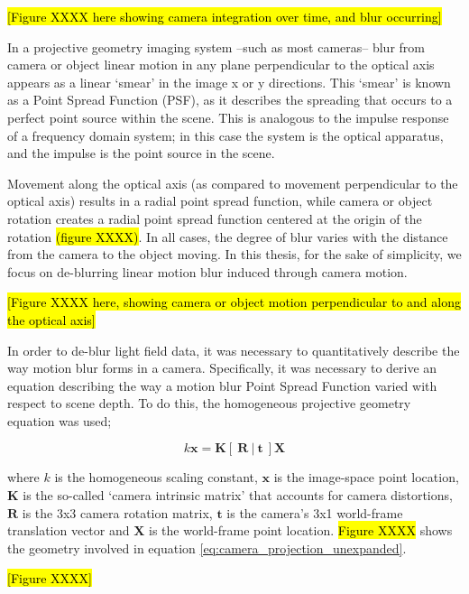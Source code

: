 \hl{[Figure XXXX here showing camera integration over time, and blur occurring]}

In a projective geometry imaging system --such as most cameras-- blur from camera or object linear motion in any plane perpendicular to the optical axis appears as a linear \enquote*{smear} in the image x or y directions.
This \enquote*{smear} is known as a Point Spread Function (PSF), as it describes the spreading that occurs to a perfect point source within the scene.
This is analogous to the impulse response of a frequency domain system; in this case the system is the optical apparatus, and the impulse is the point source in the scene.

Movement along the optical axis (as compared to movement perpendicular to the optical axis) results in a radial point spread function, while camera or object rotation creates a radial point spread function centered at the origin of the rotation \hl{(figure XXXX)}.
In all cases, the degree of blur varies with the distance from the camera to the object moving.
In this thesis, for the sake of simplicity, we focus on de-blurring linear motion blur induced through camera motion.

\hl{[Figure XXXX here, showing camera or object motion perpendicular to and along the optical axis]}

In order to de-blur light field data, it was necessary to quantitatively describe the way motion blur forms in a camera.
Specifically, it was necessary to derive an equation describing the way a motion blur Point Spread Function varied with respect to scene depth.
To do this, the homogeneous projective geometry equation was used;

\begin{equation}
\label{eq:camera_projection_unexpanded}
k \boldsymbol{x} = \boldsymbol{K} \left[~\boldsymbol{R}~|~\boldsymbol{t}~\right] \boldsymbol{X}
\end{equation}

where $k$ is the homogeneous scaling constant, $\boldsymbol{x}$ is the image-space point location, $\boldsymbol{K}$ is the so-called \enquote*{camera intrinsic matrix} that accounts for camera distortions, $\boldsymbol{R}$ is the 3x3 camera rotation matrix,  $\boldsymbol{t}$ is the camera's 3x1 world-frame translation vector and $\boldsymbol{X}$ is the world-frame point location.
\hl{Figure XXXX} shows the geometry involved in equation \ref{eq:camera_projection_unexpanded}.

\hl{[Figure XXXX]}

